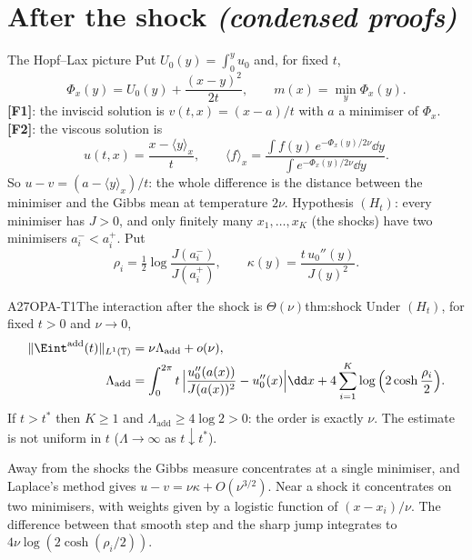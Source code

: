 
\section{After the shock \emph{(condensed proofs)}}

\begin{notebox}{The Hopf--Lax picture}
Put $U_0(y)=\int_0^yu_0$ and, for fixed $t$,
\[
\Phi_x(y)=U_0(y)+\frac{(x-y)^2}{2t},\qquad m(x)=\min_y\Phi_x(y).
\]
\textbf{[F1]}: the inviscid solution is $v(t,x)=(x-a)/t$ with $a$ a minimiser of $\Phi_x$. \textbf{[F2]}: the viscous solution is
\[
u(t,x)=\frac{x-\langle y\rangle_x}{t},\qquad \langle f\rangle_x=\frac{\int f(y)\,e^{-\Phi_x(y)/2\nu}\dd y}{\int e^{-\Phi_x(y)/2\nu}\dd y}.
\]
So $u-v=(a-\langle y\rangle_x)/t$: the whole difference is the distance between the minimiser and the Gibbs mean at temperature $2\nu$. Hypothesis $(H_t)$: every minimiser has $J>0$, and only finitely many $x_1,\dots,x_K$ (the shocks) have two minimisers $a_i^-<a_i^+$. Put
\[
\rho_i=\tfrac12\log\frac{J(a_i^-)}{J(a_i^+)},\qquad \kappa(y)=\frac{t\,u_0''(y)}{J(y)^2}.
\]
\end{notebox}

\begin{dimcard}{A27}{OPA-T1}{The interaction after the shock is $\Theta(\nu)$}{}{thm:shock}
Under $(H_t)$, for fixed $t>0$ and $\nu\to0$,
\begin{align*}
\|\Eint^{\mathrm{add}}(t)\|_{L^1(\mathbb T)}&=\nu\Lambda_{\mathrm{add}}+o(\nu),\\
\Lambda_{\mathrm{add}}&=\int_0^{2\pi}t\,\Big|\frac{u_0''(a(x))}{J(a(x))^2}-u_0''(x)\Big|\dd x+4\sum_{i=1}^K\log\Big(2\cosh\frac{\rho_i}{2}\Big).
\end{align*}
If $t>t^*$ then $K\ge1$ and $\Lambda_{\mathrm{add}}\ge4\log2>0$: the order is exactly $\nu$. The estimate is not uniform in $t$ ($\Lambda\to\infty$ as $t\downarrow t^*$).
\end{dimcard}

\begin{proofidea}
Away from the shocks the Gibbs measure concentrates at a single minimiser, and Laplace's method gives $u-v=\nu\kappa+O(\nu^{3/2})$. Near a shock it concentrates on two minimisers, with weights given by a logistic function of $(x-x_i)/\nu$. The difference between that smooth step and the sharp jump integrates to $4\nu\log(2\cosh(\rho_i/2))$.
\end{proofidea}

